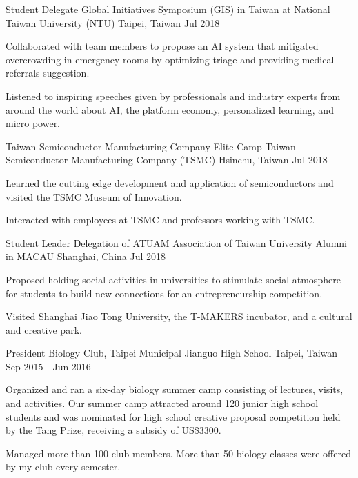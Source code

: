 \begin{cventries}
    \cventry
    {Student Delegate} %
    {Global Initiatives Symposium (GIS) in Taiwan at National Taiwan University (NTU)} %
    {Taipei, Taiwan} %
    {Jul 2018} %
    {
	\begin{cvitems} %
      	\item Collaborated with team members to propose an AI system that mitigated overcrowding in emergency rooms by optimizing triage and providing medical referrals suggestion. 
      	\item Listened to inspiring speeches given by professionals and industry experts from around the world about AI, the platform economy, personalized learning, and micro power.
	\end{cvitems}
    }  
    
    \cventry
    {Taiwan Semiconductor Manufacturing Company Elite Camp} %
    {Taiwan Semiconductor Manufacturing Company (TSMC)} %
    {Hsinchu, Taiwan} %
    {Jul 2018} %
    {
	\begin{cvitems} %
      	\item Learned the cutting edge development and application of semiconductors and visited the TSMC Museum of Innovation. 
      	\item Interacted with employees at TSMC and professors working with TSMC.
	\end{cvitems}
    } 
    
     \cventry
    {Student Leader Delegation of ATUAM} %
    {Association of Taiwan University Alumni in MACAU} %
    {Shanghai, China} %
    {Jul 2018} %
    {
	\begin{cvitems} %
      	\item Proposed holding social activities in universities to stimulate social atmosphere for students to build new connections for an entrepreneurship competition. 
      	\item Visited Shanghai Jiao Tong University, the T-MAKERS incubator, and a cultural and creative park.
	\end{cvitems}
    } 
    
    \cventry
    {President} %
    {Biology Club, Taipei Municipal Jianguo High School} %
    {Taipei, Taiwan} %
    {Sep 2015 - Jun 2016} %
    {
	\begin{cvitems} %
      	\item Organized and ran a six-day biology summer camp consisting of lectures, visits, and activities. Our summer camp attracted around 120 junior high school students and was nominated for high school creative proposal competition held by the Tang Prize, receiving a subsidy of US\$3300. 
      	\item Managed more than 100 club members. More than 50 biology classes were offered by my club every semester.
	\end{cvitems}
    } 
    
    

\end{cventries}
